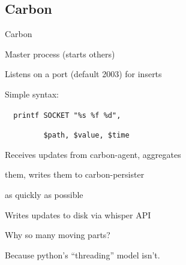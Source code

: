 \documentclass[smaller]{beamer} %
\begin{document}
\subsection{Carbon}
\begin{frame}[fragile]{Carbon}
    \def\filler{\tt\ \ \ \ \ \ \ \ \ \ \ \ \ \ \ \ \hfill}
    \def\qafiller{\tt\ \ \ \ \ \ \ \ \ \ \ \ \ \ \hfill}
    \begin{description}
        \item<1->[\tt carbon-agent\ \ \ \ \hfill]       Master process (starts others)
        \item<1->[\filler]                              Listens on a port (default 2003) for inserts
        \item<1->[\filler]                              Simple syntax:
        \item<1->[\filler]                              \verb|  printf SOCKET "%s %f %d",|
        \item<1->[\filler]                              \verb|         $path, $value, $time|
        \item<2->[\tt carbon-cache\ \ \ \ \hfill]       Receives updates from carbon-agent, aggregates
        \item<2->[\filler]                              them, writes them to carbon-persister
        \item<2->[\filler]                              as quickly as possible
        \item<3->[\tt carbon-persister\hfill]           Writes updates to disk via whisper API
        \item<4->[Q:\qafiller]                      Why so many moving parts?
        \item<5->[A:\qafiller]                      Because python's ``threading'' model isn't.
    \end{description}

\end{frame}
\end{document}
